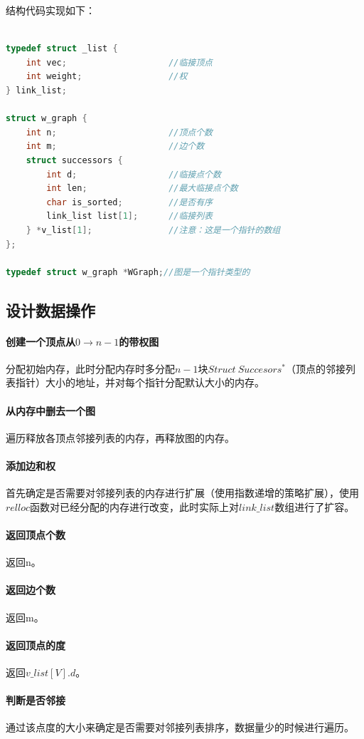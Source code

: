 \documentclass[a4paper,10pt]{ctexart}
\begin{document}
\newpage
结构代码实现如下：
\begin{lstlisting}[language={C}]

typedef struct _list {
    int vec;                    //临接顶点
    int weight;                 //权
} link_list;

struct w_graph {
    int n;                      //顶点个数
    int m;                      //边个数
    struct successors {
        int d;                  //临接点个数
        int len;                //最大临接点个数
        char is_sorted;         //是否有序
        link_list list[1];      //临接列表
    } *v_list[1];               //注意：这是一个指针的数组
};

typedef struct w_graph *WGraph;//图是一个指针类型的
\end{lstlisting}
\subsection{设计数据操作}

\paragraph{创建一个顶点从$0 \to n-1$的带权图}分配初始内存，此时分配内存时多分配$n-1$块$Struct\ Succesors^*$（顶点的邻接列表指针）大小的地址，并对每个指针分配默认大小的内存。
\paragraph{从内存中删去一个图}遍历释放各顶点邻接列表的内存，再释放图的内存。
\paragraph{添加边和权}首先确定是否需要对邻接列表的内存进行扩展（使用指数递增的策略扩展），使用$relloc$函数对已经分配的内存进行改变，此时实际上对$link\_list$数组进行了扩容。
\paragraph{返回顶点个数}返回n。
\paragraph{返回边个数}返回m。
\paragraph{返回顶点的度}返回$v\_list[V].d$。
\paragraph{判断是否邻接}通过该点度的大小来确定是否需要对邻接列表排序，数据量少的时候进行遍历。
\end{document}
